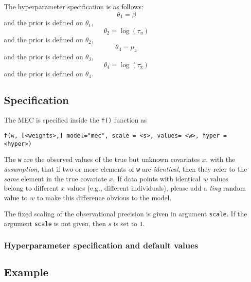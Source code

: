 \documentclass[a4paper,11pt]{article}
\begin{document}
The hyperparameter specification is as follows:
\begin{displaymath}
\theta_{1} = \beta
\end{displaymath}
and the prior is defined on $\theta_{1}$,
\begin{displaymath}
\theta_{2} = \log(\tau_u)
\end{displaymath}
and the prior is defined on $\theta_{2}$,
\begin{displaymath}
\theta_{3} = \mu_{x}
\end{displaymath}
and the prior is defined on $\theta_{3}$,
\begin{displaymath}
\theta_{4} = \log(\tau_{\text{x}})
\end{displaymath}
and the prior is defined on $\theta_{4}$.


\subsection*{Specification}

The MEC is specified inside the {\tt f()}
function as
\begin{verbatim}
f(w, [<weights>,] model="mec", scale = <s>, values= <w>, hyper = <hyper>)
\end{verbatim}

The \texttt{w} are the observed values of the true but unknown covariates
$x$, with the \emph{assumption}, that if two or more elements of
\texttt{w} are \emph{identical}, then they refer to the
\emph{same} element in the true covariate $x$. If data points with identical $w$ values belong to different $x$ values (e.g., different individuals), please add a \emph{tiny} random value to $w$ to make this difference obvious to the model.

The fixed scaling of
the observational precision is given in argument \texttt{scale}. If
the argument \texttt{scale} is not given, then $s$ is set to $1$.


\subsubsection*{Hyperparameter specification and default values}


\subsection*{Example}


\end{document}
